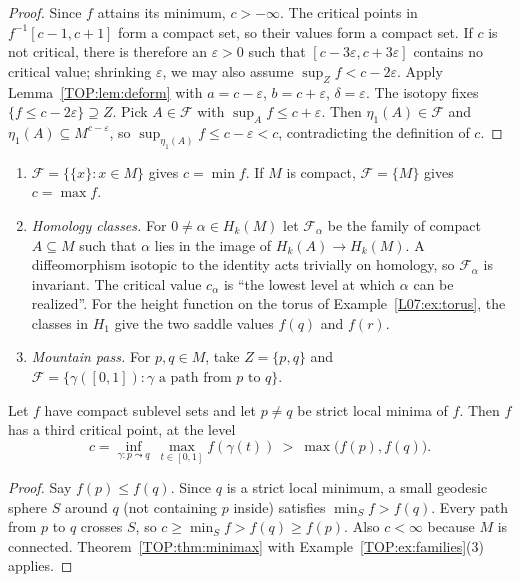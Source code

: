\begin{proof}
Since $f$ attains its minimum, $c>-\infty$. The critical points in $f^{-1}[c-1,c+1]$ form a compact
set, so their values form a compact set. If $c$ is not critical, there is therefore an $\varepsilon>0$ such
that $[c-3\varepsilon,c+3\varepsilon]$ contains no critical value; shrinking $\varepsilon$, we may also assume
$\sup_Zf<c-2\varepsilon$. Apply Lemma~\ref{TOP:lem:deform} with $a=c-\varepsilon$, $b=c+\varepsilon$,
$\delta=\varepsilon$. The isotopy fixes $\{f\le c-2\varepsilon\}\supseteq Z$. Pick $A\in\mathcal F$ with
$\sup_Af\le c+\varepsilon$. Then $\eta_1(A)\in\mathcal F$ and $\eta_1(A)\subseteq M^{c-\varepsilon}$, so
$\sup_{\eta_1(A)}f\le c-\varepsilon<c$, contradicting the definition of $c$.
\end{proof}

\begin{example}\label{TOP:ex:families}\leavevmode
\begin{enumerate}[nosep]
\item $\mathcal F=\{\{x\}:x\in M\}$ gives $c=\min f$. If $M$ is compact, $\mathcal F=\{M\}$ gives $c=\max f$.
\item \emph{Homology classes.} For $0\neq\alpha\in H_k(M)$ let $\mathcal F_\alpha$ be the family of compact
  $A\subseteq M$ such that $\alpha$ lies in the image of $H_k(A)\to H_k(M)$. A diffeomorphism isotopic to
  the identity acts trivially on homology, so $\mathcal F_\alpha$ is invariant. The critical value
  $c_\alpha$ is ``the lowest level at which $\alpha$ can be realized''. For the height function on the
  torus of Example~\ref{L07:ex:torus}, the classes in $H_1$ give the two saddle values $f(q)$ and $f(r)$.
\item \emph{Mountain pass.} For $p,q\in M$, take $Z=\{p,q\}$ and $\mathcal F=\{\gamma([0,1]):\gamma
  \text{ a path from }p\text{ to }q\}$.
\end{enumerate}
\end{example}

\begin{corollary}\label{TOP:cor:mp}
Let $f$ have compact sublevel sets and let $p\neq q$ be strict local minima of $f$. Then $f$ has a third
critical point, at the level
\[
  c=\inf_{\gamma\colon p\leadsto q}\ \max_{t\in[0,1]}f(\gamma(t))\ >\ \max\big(f(p),f(q)\big).
\]
\end{corollary}

\begin{proof}
Say $f(p)\le f(q)$. Since $q$ is a strict local minimum, a small geodesic sphere $S$ around $q$ (not
containing $p$ inside) satisfies $\min_Sf>f(q)$. Every path from $p$ to $q$ crosses $S$, so
$c\ge\min_Sf>f(q)\ge f(p)$. Also $c<\infty$ because $M$ is connected. Theorem~\ref{TOP:thm:minimax}
with Example~\ref{TOP:ex:families}(3) applies.
\end{proof}

